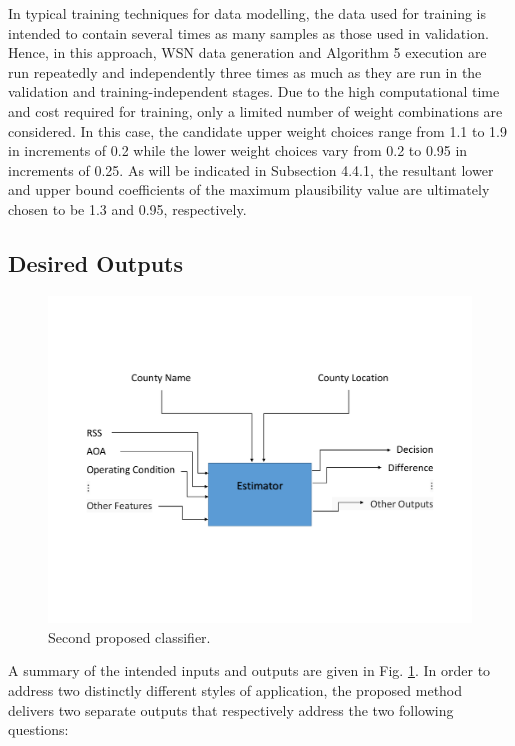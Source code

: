 \documentclass[12pt]{uthesis-v12}  %
\begin{document}
In typical training techniques for data modelling, the data used for training is intended to contain several times as many samples as those used in validation. Hence, in this approach, WSN data generation and Algorithm 5 execution are run repeatedly and independently three times as much as they are run in the validation and training-independent stages. Due to the high computational time and cost required for training, only a limited number of weight combinations are considered. In this case, the candidate upper weight choices range from 1.1 to 1.9 in increments of 0.2 while the lower weight choices vary from 0.2 to 0.95 in increments of 0.25. As will be indicated in Subsection 4.4.1, the resultant lower and upper bound coefficients of the maximum plausibility value are ultimately chosen to be 1.3 and 0.95, respectively.

\subsection{Desired Outputs}

\begin{figure}[!t]
\centering
\includegraphics[width=6in]{classifier}
\caption{Second proposed classifier.}
\label{class2}
\end{figure}

A summary of the intended inputs and outputs are given in Fig. \ref{class2}. In order to address two distinctly different styles of application, the proposed method delivers two separate outputs that respectively address the two following questions:
\end{document}
